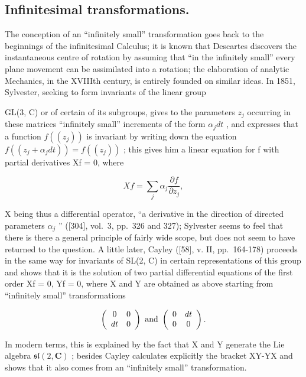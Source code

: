 \subsection{Infinitesimal transformations.}

The conception of an ``infinitely small'' transformation goes back to the beginnings of the infinitesimal Calculus; it is known that Descartes discovers the instantaneous centre of rotation by assuming that ``in the infinitely small'' every plane movement can be assimilated into a rotation; the elaboration of analytic Mechanics, in the XVIIIth century, is entirely founded on similar ideas. In 1851, Sylvester, seeking to form invariants of the linear group

GL(3, C) or of certain of its subgroups, gives to the parameters \(z_{j}\) occurring in these matrices ``infinitely small'' increments of the form \(\alpha_{j}dt\) , and expresses that a function \(f((z_{j}))\) is invariant by writing down the equation \(f((z_{j} + \alpha_{j}dt)) = f((z_{j}))\) ; this gives him a linear equation for f with partial derivatives Xf = 0, where

\[
X f = \sum_ {j} \alpha_ {j} \frac {\partial f}{\partial z _ {j}},\tag{25.1}
\]

X being thus a differential operator, ``a derivative in the direction of directed parameters \(\alpha_{j}\) '' ({[}304{]}, vol.~3, pp.~326 and 327); Sylvester seems to feel that there is there a general principle of fairly wide scope, but does not seem to have returned to the question. A little later, Cayley ({[}58{]}, v. II, pp.~164-178) proceeds in the same way for invariants of SL(2, C) in certain representations of this group and shows that it is the solution of two partial differential equations of the first order Xf = 0, Yf = 0, where X and Y are obtained as above starting from ``infinitely small'' transformations

\[
\left( \begin{array}{c c} 0 & 0 \\ d t & 0 \end{array} \right) \text {   and   } \left( \begin{array}{c c} 0 & d t \\ 0 & 0 \end{array} \right).
\]

In modern terms, this is explained by the fact that X and Y generate the Lie algebra \(\mathfrak{sl}(2,\mathbf{C})\) ; besides Cayley calculates explicitly the bracket XY-YX and shows that it also comes from an ``infinitely small'' transformation.

